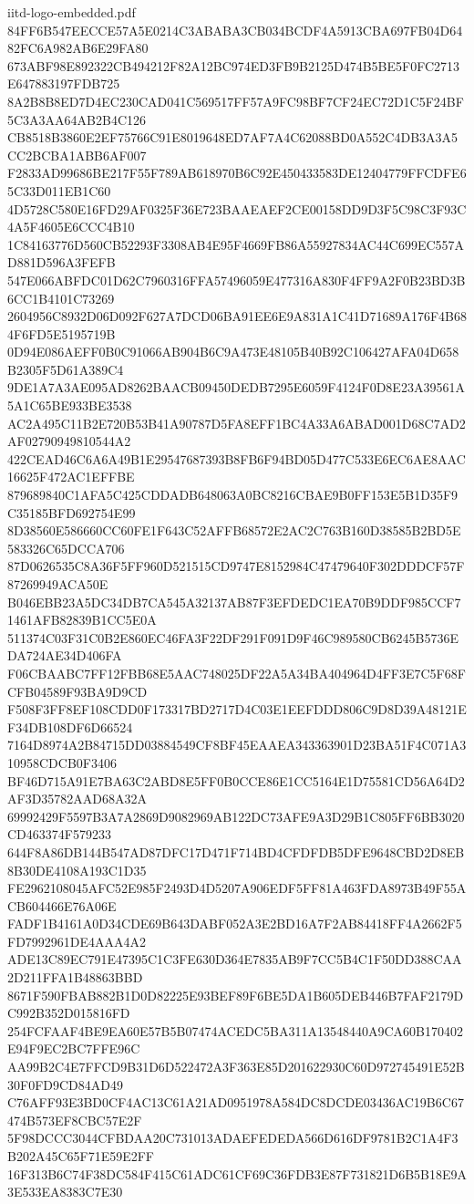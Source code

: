 \begin{filecontents*}[overwrite]{iitd-logo-embedded.pdf}
84FF6B547EECCE57A5E0214C3ABABA3CB034BCDF4A5913CBA697FB04D6482FC6A982AB6E29FA80
673ABF98E892322CB494212F82A12BC974ED3FB9B2125D474B5BE5F0FC2713E647883197FDB725
8A2B8B8ED7D4EC230CAD041C569517FF57A9FC98BF7CF24EC72D1C5F24BF5C3A3AA64AB2B4C126
CB8518B3860E2EF75766C91E8019648ED7AF7A4C62088BD0A552C4DB3A3A5CC2BCBA1ABB6AF007
F2833AD99686BE217F55F789AB618970B6C92E450433583DE12404779FFCDFE65C33D011EB1C60
4D5728C580E16FD29AF0325F36E723BAAEAEF2CE00158DD9D3F5C98C3F93C4A5F4605E6CCC4B10
1C84163776D560CB52293F3308AB4E95F4669FB86A55927834AC44C699EC557AD881D596A3FEFB
547E066ABFDC01D62C7960316FFA57496059E477316A830F4FF9A2F0B23BD3B6CC1B4101C73269
2604956C8932D06D092F627A7DCD06BA91EE6E9A831A1C41D71689A176F4B684F6FD5E5195719B
0D94E086AEFF0B0C91066AB904B6C9A473E48105B40B92C106427AFA04D658B2305F5D61A389C4
9DE1A7A3AE095AD8262BAACB09450DEDB7295E6059F4124F0D8E23A39561A5A1C65BE933BE3538
AC2A495C11B2E720B53B41A90787D5FA8EFF1BC4A33A6ABAD001D68C7AD2AF02790949810544A2
422CEAD46C6A6A49B1E29547687393B8FB6F94BD05D477C533E6EC6AE8AAC16625F472AC1EFFBE
879689840C1AFA5C425CDDADB648063A0BC8216CBAE9B0FF153E5B1D35F9C35185BFD692754E99
8D38560E586660CC60FE1F643C52AFFB68572E2AC2C763B160D38585B2BD5E583326C65DCCA706
87D0626535C8A36F5FF960D521515CD9747E8152984C47479640F302DDDCF57F87269949ACA50E
B046EBB23A5DC34DB7CA545A32137AB87F3EFDEDC1EA70B9DDF985CCF71461AFB82839B1CC5E0A
511374C03F31C0B2E860EC46FA3F22DF291F091D9F46C989580CB6245B5736EDA724AE34D406FA
F06CBAABC7FF12FBB68E5AAC748025DF22A5A34BA404964D4FF3E7C5F68FCFB04589F93BA9D9CD
F508F3FF8EF108CDD0F173317BD2717D4C03E1EEFDDD806C9D8D39A48121EF34DB108DF6D66524
7164D8974A2B84715DD03884549CF8BF45EAAEA343363901D23BA51F4C071A310958CDCB0F3406
BF46D715A91E7BA63C2ABD8E5FF0B0CCE86E1CC5164E1D75581CD56A64D2AF3D35782AAD68A32A
69992429F5597B3A7A2869D9082969AB122DC73AFE9A3D29B1C805FF6BB3020CD463374F579233
644F8A86DB144B547AD87DFC17D471F714BD4CFDFDB5DFE9648CBD2D8EB8B30DE4108A193C1D35
FE2962108045AFC52E985F2493D4D5207A906EDF5FF81A463FDA8973B49F55ACB604466E76A06E
FADF1B4161A0D34CDE69B643DABF052A3E2BD16A7F2AB84418FF4A2662F5FD7992961DE4AAA4A2
ADE13C89EC791E47395C1C3FE630D364E7835AB9F7CC5B4C1F50DD388CAA2D211FFA1B48863BBD
8671F590FBAB882B1D0D82225E93BEF89F6BE5DA1B605DEB446B7FAF2179DC992B352D015816FD
254FCFAAF4BE9EA60E57B5B07474ACEDC5BA311A13548440A9CA60B170402E94F9EC2BC7FFE96C
AA99B2C4E7FFCD9B31D6D522472A3F363E85D201622930C60D972745491E52B30F0FD9CD84AD49
C76AFF93E3BD0CF4AC13C61A21AD0951978A584DC8DCDE03436AC19B6C67474B573EF8CBC57E2F
5F98DCCC3044CFBDAA20C731013ADAEFEDEDA566D616DF9781B2C1A4F3B202A45C65F71E59E2FF
16F313B6C74F38DC584F415C61ADC61CF69C36FDB3E87F731821D6B5B18E9A3E533EA8383C7E30

\end{filecontents*}
